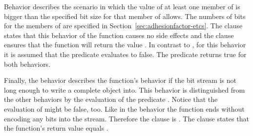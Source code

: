 Behavior  describes
the scenario in which the value of at least one
member of  is bigger than the specified
bit size for that member of
 allows.
The numbers of bits for the members of
 are specified in
Section~\ref{sec:adhesionfactor-etcs}.
The  clause states that this behavior
of the function causes no side effects and
the  clause ensures that the
function will return the value .
In contrast to ,
for this behavior it is assumed that the
 predicate evaluates
to false.
The 
predicate returns true for both behaviors.

Finally, the behavior  describes the function's
behavior if the bit stream is not long enough to
write a complete  object
into. 
This behavior is distinguished from the other
behaviors by the evaluation of the predicate
.
Notice that the evaluation of 
might be false, too.
Like in the  behavior the function
ends without encoding any bits into the stream.
Therefore the  clause is \inl{\\nothing}.
The  clause states that the function's
return value equals .

